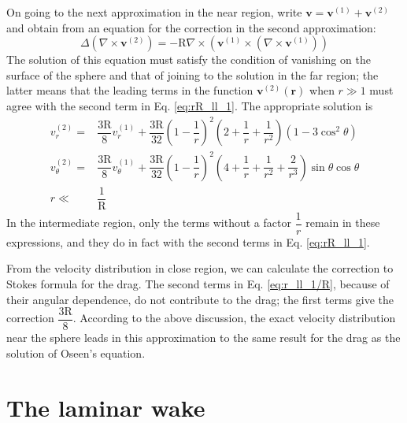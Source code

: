 \documentclass[conference]{IEEEtran}
\theoremstyle{definition}
\theoremstyle{remark}
\begin{document}
    On going to the next approximation in the near region, write $\mathbf{v} = \mathbf{v}^{(1)} + \mathbf{v}^{(2)}$ and obtain from an equation for the correction in the second approximation:
    \begin{equation}
        \Delta (\nabla \times \mathbf{v}^{(2)}) = - \mathrm{R} \nabla \times (\mathbf{v}^{(1)} \times (\nabla \times \mathbf{v}^{(1)}))
    \end{equation}
    The solution of this equation must satisfy the condition of vanishing on the surface of the sphere and that of joining to the solution in the far region; the latter means that the leading terms in the function $\mathbf{v}^{(2)}(\mathbf{r})$ when $r \gg 1$ must agree with the second term in Eq. \ref{eq:rR_ll_1}. The appropriate solution is
    \begin{align}
        v_r^{(2)} =& \dfrac{3\mathrm{R}}{8} v_r^{(1)} + \dfrac{3\mathrm{R}}{32} \left( 1 - \dfrac1r \right)^2 \left( 2 + \dfrac1r + \dfrac1{r^2} \right) (1 - 3\cos^2 \theta) \nonumber \\
        v_\theta^{(2)} =& \dfrac{3\mathrm{R}}{8} v_\theta^{(1)} + \dfrac{3\mathrm{R}}{32} \left( 1 - \dfrac1r \right)^2 \left( 4 + \dfrac1r + \dfrac1{r^2} + \dfrac2{r^3} \right) \sin\theta\cos\theta \nonumber \\
        r \ll & \dfrac1{\mathrm{R}}
        \label{eq:r_ll_1/R}
    \end{align}
    In the intermediate region, only the terms without a factor $\dfrac1r$ remain in these expressions, and they do in fact with the second terms in Eq. \ref{eq:rR_ll_1}.

    From the velocity distribution in close region, we can calculate the correction to Stokes formula for the drag. The second terms in Eq. \ref{eq:r_ll_1/R}, because of their angular dependence, do not contribute to the drag; the first terms give the correction $\dfrac{3\mathrm{R}}8$. According to the above discussion, the exact velocity distribution near the sphere leads in this approximation to the same result for the drag as the solution of Oseen's equation.

    \section{The laminar wake}
    
\end{document}

